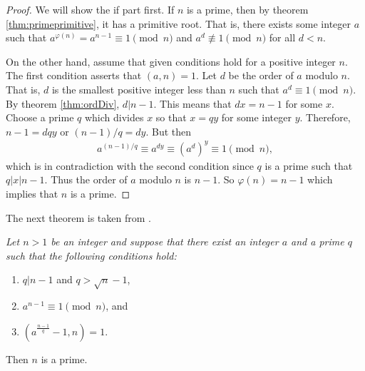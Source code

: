 \documentclass{subfiles}
\begin{document}
		\begin{proof}
			We will show the if part first. If $n$ is a prime, then by theorem \eqref{thm:primeprimitive}, it has a primitive root. That is, there exists some integer $a$ such that $a^{\varphi(n)} = a^{n-1} \equiv 1 \pmod n$ and $a^d \not \equiv 1 \pmod n$ for all $d<n$. 
			
			On the other hand, assume that given conditions hold for a positive integer $n$. The first condition asserts that $(a,n)=1$. Let $d$ be the order of $a$ modulo $n$. That is, $d$ is the smallest positive integer less than $n$ such that $a^d \equiv 1 \pmod n$. By theorem \eqref{thm:ordDiv}, $d|n-1$. This means that $dx = n-1$ for some $x$. Choose a prime $q$ which divides $x$ so that $x=qy$ for some integer $y$. Therefore, $n-1=dqy$ or $(n-1)/q=dy$. But then
				\begin{align*}
					a^{(n-1)/q} \equiv a^{dy} \equiv \left(a^d\right)^y \equiv 1 \pmod n,
				\end{align*}
			which is in contradiction with the second condition since $q$ is a prime such that $q|x|n-1$. Thus the order of $a$ modulo $n$ is $n-1$. So $\varphi(n)=n-1$ which implies that $n$ is a prime.
		\end{proof}	
	The next theorem is taken from \cite{Koblitz}.
		\begin{theorem}\slshape
			Let $n>1$ be an integer and suppose that there exist an integer $a$ and a prime $q$ such that the following conditions hold:
				\begin{enumerate}
					\item $q|n-1$ and $q > \sqrt n -1$,
					\item $a^{n-1} \equiv1\pmod n$, and
					\item $\left(a^{\frac{n-1}{q}}-1,n\right) = 1$.
				\end{enumerate}
			Then $n$ is a prime.
		\end{theorem}
		
\end{document}
